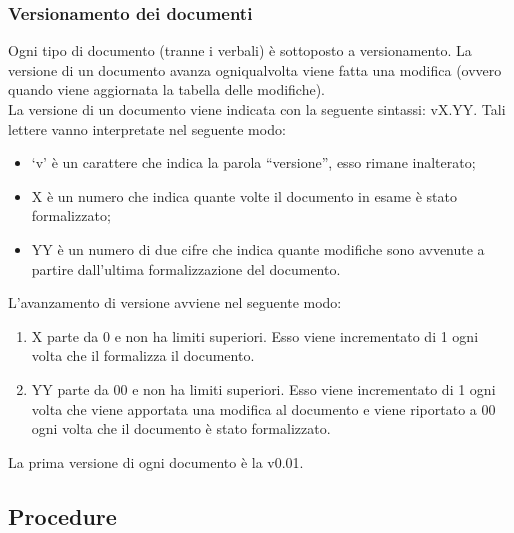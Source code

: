 		\subsubsection{Versionamento dei documenti} \label{sec:versioni}
			Ogni tipo di documento (tranne i verbali) è sottoposto a versionamento. La versione di un documento avanza ogniqualvolta viene fatta una modifica (ovvero quando viene aggiornata la tabella delle modifiche).\\
			La versione di un documento viene indicata con la seguente sintassi: vX.YY. Tali lettere vanno interpretate nel seguente modo:
			\begin{itemize}
				\item ‘v’ è un carattere che indica la parola “versione”, esso rimane inalterato;
				\item X è un numero che indica quante volte il documento in esame è stato formalizzato;
				\item YY è un numero di due cifre che indica quante modifiche sono avvenute a partire dall’ultima formalizzazione del documento.
			\end{itemize}
			L’avanzamento di versione avviene nel seguente modo:
			\begin{enumerate}
				\item X parte da 0 e non ha limiti superiori. Esso viene incrementato di 1 ogni volta che il  formalizza il documento.
				\item YY parte da 00 e non ha limiti superiori. Esso viene incrementato di 1 ogni volta che viene apportata una modifica al documento e viene riportato a 00 ogni volta che il documento è stato formalizzato.
			\end{enumerate}
			La prima versione di ogni documento è la v0.01.
	\subsection{Procedure}
